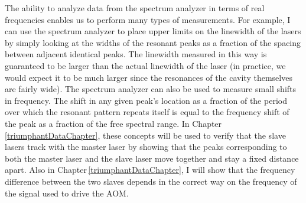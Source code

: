 The ability to analyze data from the spectrum analyzer in terms of real frequencies enables us to perform many types of measurements.
For example, I can use the spectrum analyzer to place upper limits on the linewidth of the lasers by simply looking at the widths of the resonant peaks as a fraction of the spacing between adjacent identical peaks. The linewidth measured in this way is guaranteed to be larger than the actual linewidth of the laser (in practice, we would expect it to be much larger since the resonances of the cavity themselves are fairly wide).
The spectrum analyzer can also be used to measure small shifts in frequency. The shift in any given peak's location as a fraction of the period over which the resonant pattern repeats itself is equal to the frequency shift of the peak as a fraction of the free spectral range. In Chapter\,\ref{triumphantDataChapter}, these concepts will be used to verify that the slave lasers track with the master laser by showing that the peaks corresponding to both the master laser and the slave laser move together and stay a fixed distance apart. Also in Chapter\,\ref{triumphantDataChapter}, I will show that the frequency difference between the two slaves depends in the correct way on the frequency of the signal used to drive the AOM. 





